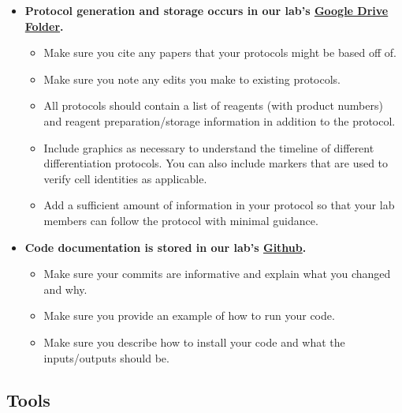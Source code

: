 \documentclass[
]{book}
\providecommand{\tightlist}{%
  \setlength{\itemsep}{0pt}\setlength{\parskip}{0pt}}
\begin{document}
\begin{itemize}
\tightlist
\item
  \textbf{Protocol generation and storage occurs in our lab's \protect\hyperlink{googledrive}{Google Drive Folder}.}

  \begin{itemize}
  \item
    Make sure you cite any papers that your protocols might be based off of.
  \item
    Make sure you note any edits you make to existing protocols.
  \item
    All protocols should contain a list of reagents (with product numbers) and reagent preparation/storage information in addition to the protocol.
  \item
    Include graphics as necessary to understand the timeline of different differentiation protocols. You can also include markers that are used to verify cell identities as applicable.
  \item
    Add a sufficient amount of information in your protocol so that your lab members can follow the protocol with minimal guidance.
  \end{itemize}
\item
  \textbf{Code documentation is stored in our lab's \protect\hyperlink{github}{Github}.}

  \begin{itemize}
  \item
    Make sure your commits are informative and explain what you changed and why.
  \item
    Make sure you provide an example of how to run your code.
  \item
    Make sure you describe how to install your code and what the inputs/outputs should be.
  \end{itemize}
\end{itemize}

\hypertarget{tools}{%
\subsection{Tools}\label{tools}}
\end{document}
